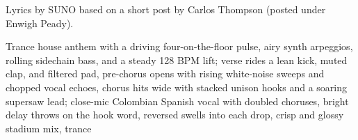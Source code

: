 
\begin{notes}
Lyrics by SUNO based on a short post by Carlos Thompson (posted under Enwigh Peady).
\end{notes}
\begin{style}
Trance house anthem with a driving four-on-the-floor pulse, airy synth arpeggios, rolling sidechain bass, and a steady 128 BPM lift; verse rides a lean kick, muted clap, and filtered pad, pre-chorus opens with rising white-noise sweeps and chopped vocal echoes, chorus hits wide with stacked unison hooks and a soaring supersaw lead; close-mic Colombian Spanish vocal with doubled choruses, bright delay throws on the hook word, reversed swells into each drop, crisp and glossy stadium mix, trance
\end{style}
